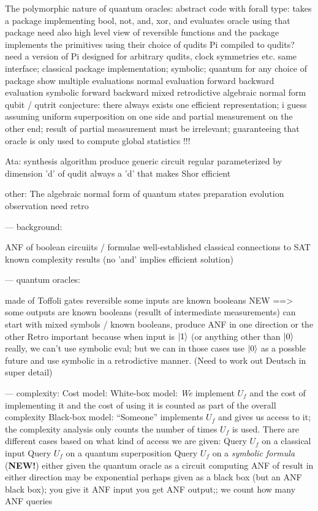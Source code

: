 \documentclass[aps,prl,twocolumn,superscriptaddress,floatfix,notitlepage]{revtex4-2}
\begin{document}
The polymorphic nature of quantum oracles:
  abstract code with forall type: takes a package implementing bool,
  not, and, xor, and evaluates oracle using that package
  need also high level view of reversible functions and the package
  implements the primitives using their choice of qudits
  Pi compiled to qudits?
  need a version of Pi designed for arbitrary qudits, clock symmetries etc.
same interface; classical package implementation; symbolic; quantum
for any choice of package show multiple evaluations
  normal evaluation forward
  backward evaluation
  symbolic forward backward
  mixed retrodictive
  algebraic normal form
  qubit / qutrit
conjecture:
  there always exists one efficient representation; i guess
  assuming uniform superposition on one side and partial measurement on
  the other end; result of partial measurement must be irrelevant;
  guaranteeing that oracle is only used to compute global statistics !!!

\bigskip 

  Ata:
  synthesis algorithm 
  produce generic circuit regular parameterized by dimension 'd' of qudit
  always a 'd' that makes Shor efficient

\bigskip 

other: The algebraic normal form  of quantum states  
preparation
evolution
observation
need retro 

\bigskip 
---
background:

ANF of boolean circuiits / formulae well-established
classical
connections to SAT
known complexity results (no 'and' implies efficient solution)

\bigskip 
---
quantum oracles:

made of Toffoli gates
reversible
some inputs are known booleans
NEW ==> some outputs are known booleans (resullt of intermediate measurements)
can start with mixed symbols / known booleans, produce ANF in one
direction or the other
Retro important because when input is $\ket{1}$ (or anything
  other than $\ket{0}$ really, we can't use symbolic eval; but we can
  in those cases use $\ket{0}$ as a possble future and use symbolic in
  a retrodictive manner. (Need to work out Deutsch in super detail)

\bigskip 
---
complexity:
Cost model:
   White-box model: \emph{We} implement $U_f$ and the cost of
    implementing it and the cost of using it is counted as part of the
    overall complexity
   Black-box model: ``Someone'' implements $U_f$ and gives us
    access to it; the complexity analysis only counts the number of
    times $U_f$ is used. There are different cases based on what kind of
    access we are given:
      Query $U_f$ on a classical input 
      Query $U_f$ on a quantum superposition
      Query $U_f$ on a \emph{symbolic formula} (\textbf{NEW!})
either given the quantum oracle as a circuit
computing ANF of result in either direction may be exponential
perhaps given as a black box (but an ANF black box); you give it ANF
input you get ANF output;; we count how many ANF queries
\end{document}
